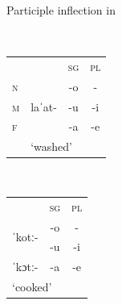 \documentclass[output=paper,colorlinks,citecolor=brown]{langscibook}
\begin{document}
\noindent\begin{minipage}{\textwidth}
	\begin{exe}
		\ex \label{04ex20}
		Participle inflection in  \citep[54]{paciaroni2017}
		\begin{multicols}{3}
			\begin{xlist}
				\ex \label{04ex20a} \phantom{x} \vspace*{0.2cm} \\
				\hspace*{-0.5cm}\begin{tabularx}{\linewidth}{llll}
					& & \textsc{sg} & \textsc{pl} \\
					\cline{2-3}
					\textsc{n} & \multicolumn{1}{|c|}{\multirow{3}{*}{laˈat-}} & \multicolumn{1}{c|}{-o} & \multicolumn{1}{c}{-} \\
					\cline{3-4}
					\textsc{m} & \multicolumn{1}{|c|}{} & \multicolumn{1}{c|}{-u} & \multicolumn{1}{c|}{-i} \\
					\cline{3-4}
					\textsc{f} & \multicolumn{1}{|c|}{} & \multicolumn{1}{c|}{-a} & \multicolumn{1}{c|}{-e}\\
					\cline{2-4}
					& \multicolumn{3}{l}{\rule{0pt}{0.5cm}‘washed’} \\
				\end{tabularx}
				
				\ex \label{04ex20b} \phantom{x} \vspace*{0.2cm} \\
				\hspace*{-0.5cm}\begin{tabularx}{\linewidth}{lll}
					& \textsc{sg} & \textsc{pl} \\
					\cline{1-2}
					\multicolumn{1}{|c|}{\multirow{2}{*}{ˈkotː-}} & \multicolumn{1}{c|}{-o} & \multicolumn{1}{c}{-} \\
					\cline{2-3}
					\multicolumn{1}{|c|}{} & \multicolumn{1}{c|}{-u} & \multicolumn{1}{c|}{-i} \\
					\cline{1-3}
					\multicolumn{1}{|c|}{ˈkɔtː-} & \multicolumn{1}{c|}{-a} & \multicolumn{1}{c|}{-e} \\
					\cline{1-3}
					\multicolumn{3}{l}{\rule{0pt}{0.5cm}‘cooked’} \\
				\end{tabularx}
				

\end{xlist}
\end{multicols}
\end{exe}
\end{minipage}
\end{document}

